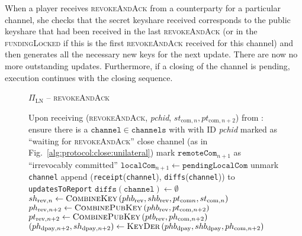   When a player receives \textsc{revokeAndAck} from a counterparty for a
  particular channel, she checks that the secret keyshare received corresponds
  to the public keyshare that had been received in the last
  \textsc{revokeAndAck} (or in the \textsc{fundingLocked} if this is the first
  \textsc{revokeAndAck} received for this channel) and then generates all the
  necessary new keys for the next update. There are now no more outstanding
  updates. Furthermore, if a closing of the channel is pending, execution
  continues with the closing sequence.

  \begin{figure}[H]
    \begin{protocolbox}{$\Pi_{\mathrm{LN}}$ -- \textsc{revokeAndAck}}
      \begin{algorithmic}[1]
        \State Upon receiving (\textsc{revokeAndAck}, \textit{pchid},
        $st_{\mathrm{com}, n}, pt_{\mathrm{com}, n+2}$) from \bob:
        \Indent
          \State ensure there is a $\mathtt{channel} \in \mathtt{channels}$ with
          \bob{} with ID \textit{pchid} marked as ``waiting for
          \textsc{revokeAndAck}''
          \label{alg:protocol:pay:revokeAndAck:ensure}
           
            \State close channel (as in
            Fig.~\ref{alg:protocol:close:unilateral})
            \State \Return
          \EndIf
          \State mark $\mathtt{remoteCom}_{n+1}$ as ``irrevocably committed''
          \State $\mathtt{localCom}_{n+1} \gets \mathtt{pendingLocalCom}$
          \State unmark \texttt{channel}
          \State append (\texttt{receipt}(\texttt{channel}),
          \texttt{diffs}(\texttt{channel})) to \texttt{updatesToReport}
          \label{alg:protocol:pay:raa:report}
          \State $\mathtt{diffs}(\mathtt{channel}) \gets \emptyset$
          \State $sh_{\mathrm{rev}, n} \gets
          \textsc{CombineKey}\left(phb_{\mathrm{rev}}, shb_{\mathrm{rev}},
          pt_{\mathrm{com} n}, st_{\mathrm{com}, n}\right)$
          \State $ph_{\mathrm{rev}, n+2} \gets
          \textsc{CombinePubKey}\left(phb_{\mathrm{rev}}, pt_{\mathrm{com},
          n+2}\right)$
          \State $pt_{\mathrm{rev}, n+2} \gets
          \textsc{CombinePubKey}\left(ptb_{\mathrm{rev}}, ph_{\mathrm{com},
          n+2}\right)$
          \State $(ph_{\mathrm{dpay}, n+2}, sh_{\mathrm{dpay}, n+2}) \gets
          \textsc{KeyDer}\left(phb_{\mathrm{dpay}}, shb_{\mathrm{dpay}},
          ph_{\mathrm{com}, n+2}\right)$

\end{algorithmic}
\end{protocolbox}
\end{figure}
